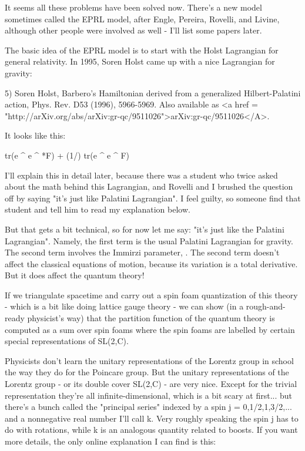 It seems all these problems have been solved now.  There's a new model
sometimes called the EPRL model, after Engle, Pereira, Rovelli, and
Livine, although other people were involved as well - I'll list some
papers later.

The basic idea of the EPRL model is to start with the Holst 
Lagrangian for general relativity.  In 1995, Soren Holst came
up with a nice Lagrangian for gravity:

5) Soren Holst, Barbero's Hamiltonian derived from a generalized
Hilbert-Palatini action, Phys. Rev. D53 (1996), 5966-5969.  Also
available as <a href =
"http://arXiv.org/abs/arXiv:gr-qc/9511026">arXiv:gr-qc/9511026</A>.

It looks like this:

tr(e ^ e ^ *F) + (1/\gamma ) tr(e ^ e ^ F)

I'll explain this in detail later, because there was a student who
twice asked about the math behind this Lagrangian, and Rovelli and I
brushed the question off by saying "it's just like Palatini
Lagrangian".  I feel guilty, so someone find that student and
tell him to read my explanation below.

But that gets a bit technical, so for now let me say: "it's just
like the Palatini Lagrangian".  Namely, the first term is the
usual Palatini Lagrangian for gravity.  The second term involves the
Immirzi parameter, \gamma .  The second term doesn't affect the
classical equations of motion, because its variation is a total
derivative.  But it does affect the quantum theory!

If we triangulate spacetime and carry out a spin foam quantization of
this theory - which is a bit like doing lattice gauge theory - we can
show (in a rough-and-ready physicist's way) that the partition
function of the quantum theory is computed as a sum over spin foams
where the spin foams are labelled by certain special representations
of SL(2,C).

Physicists don't learn the unitary representations of the Lorentz
group in school the way they do for the Poincare group.  But the
unitary representations of the Lorentz group - or its double cover
SL(2,C) - are very nice.  Except for the trivial representation
they're all infinite-dimensional, which is a bit scary at first...
but there's a bunch called the "principal series" indexed by
a spin j = 0,1/2,1,3/2,... and a nonnegative real number I'll call k.
Very roughly speaking the spin j has to do with rotations, while k is
an analogous quantity related to boosts.  If you want more details,
the only online explanation I can find is this:

